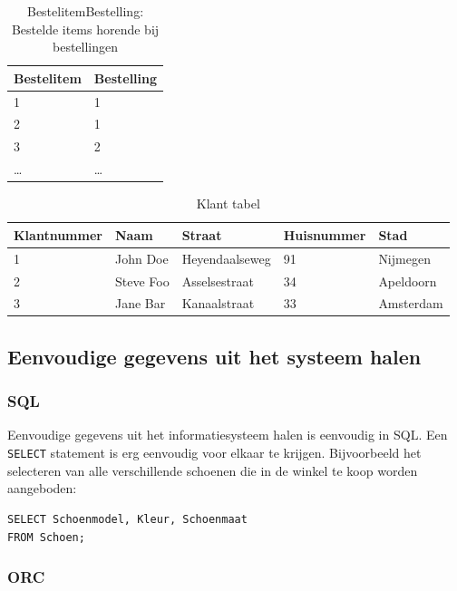 \documentclass{article}
\begin{document}
\begin{table}[hp]
  \centering
  \begin{tabular}{l|l}
    \textbf{Bestelitem} & \textbf{Bestelling}\\ 
    \hline
    1      & 1      \\
    2      & 1      \\
    3      & 2      \\
    \ldots & \ldots \\
  \end{tabular}
  \caption{BestelitemBestelling: Bestelde items horende bij bestellingen}
  \label{tab:bestelitembestelling}
\end{table}

\begin{table}[hp]
  \centering
  \begin{tabular}{l|l|l|l|l}
    \textbf{Klantnummer} & \textbf{Naam} & \textbf{Straat} & \textbf{Huisnummer} & \textbf{Stad} \\
    \hline
    1 & John Doe & Heyendaalseweg & 91 & Nijmegen \\
    2 & Steve Foo & Asselsestraat & 34 & Apeldoorn \\
    3 & Jane Bar  & Kanaalstraat  & 33 & Amsterdam \\
  \end{tabular}
  \caption{Klant tabel}
  \label{tab:klant}
\end{table}

\subsection{Eenvoudige gegevens uit het systeem halen}

\subsubsection{SQL}

Eenvoudige gegevens uit het informatiesysteem halen is eenvoudig in SQL. Een
\verb+SELECT+ statement is erg eenvoudig voor elkaar te krijgen. Bijvoorbeeld
het selecteren van alle verschillende schoenen die in de winkel te koop worden
aangeboden:

\begin{verbatim}
SELECT Schoenmodel, Kleur, Schoenmaat 
FROM Schoen;
\end{verbatim}

\subsubsection{ORC}
\end{document}
